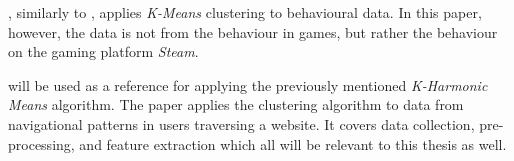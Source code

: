 \documentclass{article}
\begin{document}
\cite{BaumannFlorian2018HGPR}, similarly to \cite{DrachenA.2012Gsad}, applies {\it K-Means} clustering to behavioural data. In this paper, however, the data is not from the behaviour in games, but rather the behaviour on the gaming platform {\it Steam}.

\cite{GobinathR.2013Aokm} will be used as a reference for applying the previously mentioned {\it K-Harmonic Means} algorithm. The paper applies the clustering algorithm to data from navigational patterns in users traversing a website. It covers data collection, pre-processing, and feature extraction which all will be relevant to this thesis as well.

{}

\end{document}

